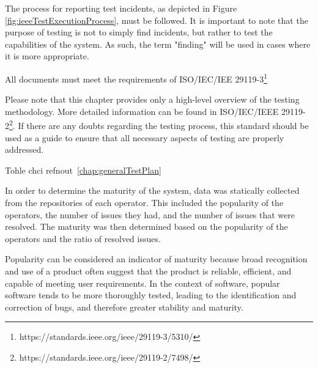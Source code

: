 The process for reporting test incidents, as depicted in Figure \ref{fig:ieeeTestExecutionProcess}, must be followed. It is important to note that the purpose of testing is not to simply find incidents, but rather to test the capabilities of the system. As such, the term "finding" will be used in cases where it is more appropriate.

All documents must meet the requirements of ISO/IEC/IEE 29119-3\footnote[4]{https://standards.ieee.org/ieee/29119-3/5310/}

Please note that this chapter provides only a high-level overview of the testing methodology. More detailed information can be found in ISO/IEC/IEEE 29119-2\footnote[5]{https://standards.ieee.org/ieee/29119-2/7498/}. If there are any doubts regarding the testing process, this standard should be used as a guide to ensure that all necessary aspects of testing are properly addressed.









Tohle chci refnout~\ref{chap:generalTestPlan}





In order to determine the maturity of the system, data was statically collected from the repositories of each operator. This included the popularity of the operators, the number of issues they had, and the number of issues that were resolved. The maturity was then determined based on the popularity of the operators and the ratio of resolved issues.

Popularity can be considered an indicator of maturity because broad recognition and use of a product often suggest that the product is reliable, efficient, and capable of meeting user requirements. In the context of software, popular software tends to be more thoroughly tested, leading to the identification and correction of bugs, and therefore greater stability and maturity.

